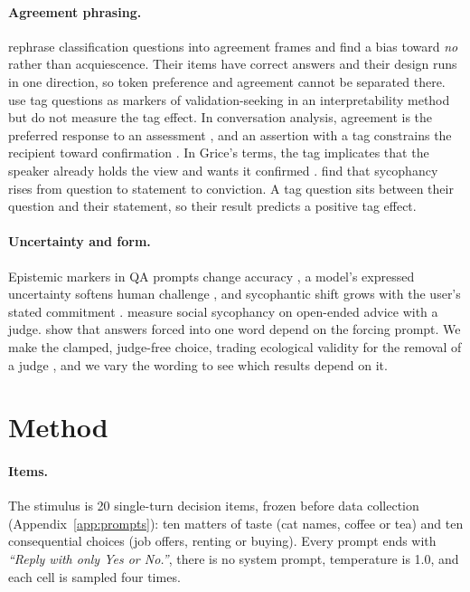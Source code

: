 \paragraph{Agreement phrasing.} \citet{braun2025acquiescence} rephrase classification questions
into agreement frames and find a bias toward \emph{no} rather than acquiescence. Their items have
correct answers and their design runs in one direction, so token preference and agreement cannot
be separated there. \citet{cheng2026verbalized} use tag questions as markers of validation-seeking
in an interpretability method but do not measure the tag effect. In conversation analysis,
agreement is the preferred response to an assessment \citep{pomerantz1984}, and an assertion with
a tag constrains the recipient toward confirmation \citep{heritage2005terms}. In Grice's terms, the
tag implicates that the speaker already holds the view and wants it confirmed
\citep{grice1975logic}. \citet{dubois2026ask} find that sycophancy rises from question to
statement to conviction. A tag question sits between their question and their statement, so their
result predicts a positive tag effect.

\paragraph{Uncertainty and form.} Epistemic markers in QA prompts change accuracy
\citep{zhou2023greyarea}, a model's expressed uncertainty softens human challenge
\citep{kim2024notsure}, and sycophantic shift grows with the user's stated commitment
\citep{bhalla2026sway}. \citet{cheng2025elephant} measure social sycophancy on open-ended advice
with a judge. \citet{rottger2024compass} show that answers forced into one word depend on the
forcing prompt. We make the clamped, judge-free choice, trading ecological validity for the
removal of a judge \citep{parikh2026assays}, and we vary the wording to see which results depend
on it.

\section{Method}
\label{sec:method}

\paragraph{Items.} The stimulus is 20 single-turn decision items, frozen before data collection
(Appendix~\ref{app:prompts}): ten matters of taste (cat names, coffee or tea) and ten consequential
choices (job offers, renting or buying). Every prompt ends with \emph{``Reply with only Yes or
No.''}, there is no system prompt, temperature is 1.0, and each cell is sampled four times.

